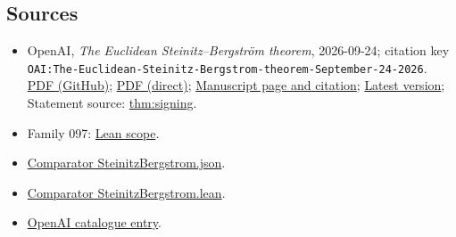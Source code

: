 \documentclass[11pt]{article}
\begin{document}
\subsection{Sources}
\begin{itemize}
\item OpenAI, \emph{The Euclidean Steinitz–Bergström theorem}, 2026-09-24; citation key \texttt{OAI:The-Euclidean-Steinitz-Bergstrom-theorem-September-24-2026}. \href{https://github.com/openai/math/blob/adc7f1241b42e322a6451854ab7e4b4c146bf78a/preprints/The-Euclidean-Steinitz-Bergstrom-theorem-September-24-2026/The-Euclidean-Steinitz-Bergstrom-theorem-September-24-2026.pdf}{PDF (GitHub)}; \href{https://github.com/openai/math/raw/adc7f1241b42e322a6451854ab7e4b4c146bf78a/preprints/The-Euclidean-Steinitz-Bergstrom-theorem-September-24-2026/The-Euclidean-Steinitz-Bergstrom-theorem-September-24-2026.pdf}{PDF (direct)}; \href{https://github.com/openai/math/blob/adc7f1241b42e322a6451854ab7e4b4c146bf78a/preprints/The-Euclidean-Steinitz-Bergstrom-theorem-September-24-2026/README.md}{Manuscript page and citation}; \href{https://github.com/openai/math/blob/main/preprints/The-Euclidean-Steinitz-Bergstrom-theorem-September-24-2026/The-Euclidean-Steinitz-Bergstrom-theorem-September-24-2026.pdf}{Latest version}; Statement source: \href{https://github.com/openai/math/blob/adc7f1241b42e322a6451854ab7e4b4c146bf78a/preprints/The-Euclidean-Steinitz-Bergstrom-theorem-September-24-2026/build/introduction.tex\#L10}{thm:signing}.
\item Family 097: \href{https://github.com/openai/math/blob/adc7f1241b42e322a6451854ab7e4b4c146bf78a/lean/docs/097.md}{Lean scope}.
\item \href{https://github.com/openai/math/blob/adc7f1241b42e322a6451854ab7e4b4c146bf78a/lean/ComparatorChallenges/SteinitzBergstrom.json}{Comparator SteinitzBergstrom.json}.
\item \href{https://github.com/openai/math/blob/adc7f1241b42e322a6451854ab7e4b4c146bf78a/lean/ComparatorChallenges/SteinitzBergstrom.lean}{Comparator SteinitzBergstrom.lean}.
\item \href{https://github.com/openai/math/blob/adc7f1241b42e322a6451854ab7e4b4c146bf78a/CONTENTS.md}{OpenAI catalogue entry}.
\end{itemize}
\end{document}

